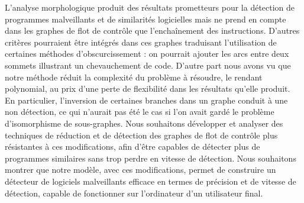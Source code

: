 L'analyse morphologique produit des résultats prometteurs pour la détection de programmes malveillants et de similarités logicielles mais ne prend en compte dans les graphes de flot de contrôle que l'enchaînement des instructions. D'autres critères pourraient être intégrés dans ces graphes traduisant l'utilisation de certaines méthodes d'obscurcissement : on pourrait ajouter les arcs entre deux sommets illustrant un chevauchement de code.
D'autre part nous avons vu que notre méthode réduit la complexité du problème à résoudre, le rendant polynomial, au prix d'une perte de flexibilité dans les résultats qu'elle produit.
En particulier, l'inversion de certaines branches  dans un graphe conduit à une non détection, ce qui n'aurait pas été le cas si l'on avait gardé le problème d'isomorphisme de sous-graphes.
Nous souhaitons développer et analyser des techniques de réduction et de détection des graphes de flot de contrôle plus résistantes à ces modifications, afin d'être capables de détecter plus de programmes similaires sans trop perdre en vitesse de détection.
Nous souhaitons montrer que notre modèle, avec ces modifications, permet de construire un détecteur de logiciels malveillants efficace en termes de précision et de vitesse de détection, capable de fonctionner sur l'ordinateur d'un utilisateur final.


